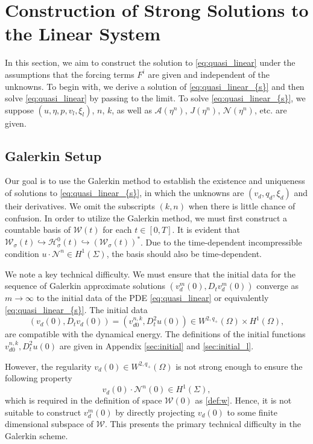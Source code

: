 \documentclass[letterpaper,reqno,10pt,twoside]{amsart}
\theoremstyle{definition}
\theoremstyle{remark}
\begin{document}
	
	\section{Construction of Strong Solutions to the Linear System}\label{sec:strong}
	
	
	In this section, we aim to construct the solution to \eqref{eq:quasi_linear} under the assumptions that the forcing terms $F^i$ are given and independent of the unknowns. To begin with, we derive a solution of \eqref{eq:quasi_linear_{s}} and then solve \eqref{eq:quasi_linear} by passing to the limit. To solve \eqref{eq:quasi_linear_{s}}, we suppose $(u,\eta,p,v_{l},\xi_{l})$, $n$, $k$, as well as $\mathcal{A}(\eta^{n})$, $J(\eta^{n})$, $\mathcal{N}(\eta^{n})$, etc. are given. 
	
	
	\subsection{Galerkin Setup}
	
	Our goal is to use the Galerkin method to establish the existence and uniqueness of solutions to \eqref{eq:quasi_linear_{s}}, in which the unknowns are $(v_{d}, q_{d}, \xi_{d})$ and their derivatives. We omit the subscripts $(k, n)$ when there is little chance of confusion. In order to utilize the Galerkin method, we must first construct a countable basis of $\mathcal{W}(t)$ for each $t\in[0, T]$. It is evident that $\mathcal{W}_{\sigma}(t)\hookrightarrow \mathcal{H}_{\sigma}^0(t)\hookrightarrow (\mathcal{W}_{\sigma}(t))^\ast$.
	Due to the time-dependent incompressible condition $u\cdot \mathcal{N}^{n}\in H^{1}(\Sigma)$, the basis should also be time-dependent.
	
	We note a key technical difficulty. We must ensure that the initial data for the sequence of Galerkin approximate solutions $(v_{d}^{m}(0),D_{t}v_{d}^{m}(0))$ converge as $m\to\infty$ to the initial data of the PDE \eqref{eq:quasi_linear} or equivalently \eqref{eq:quasi_linear_{s}}. The initial data
	\[
	(v_{d}(0),D_{t}v_{d}(0))=( v_{d0}^{n,k}, D_t^2u(0))\in W^{2,q_{+}}(\Omega)\times H^{1}(\Omega),
	\]
	are compatible with the dynamical energy. The definitions of the initial functions $v_{d0}^{n,k}, D_t^2u(0)$ are given in Appendix \ref{sec:initial} and \ref{sec:initial_l}.  
	
	However, the regularity $v_{d}(0)\in W^{2,q_{+}}(\Omega)$ is not strong enough to ensure the following property
	\[
	v_{d}(0)\cdot \mathcal{N}^{n}(0)\in H^{1}(\Sigma),
	\]
	which is required in the definition of space $\mathcal{W}(0)$ as \eqref{def:w}. Hence, it is not suitable to construct $v_{d}^{m}(0)$ by directly projecting $v_{d}(0)$ to some finite dimensional subspace of $\mathcal{W}$. This presents the primary technical difficulty in the Galerkin scheme.
	
\end{document}
